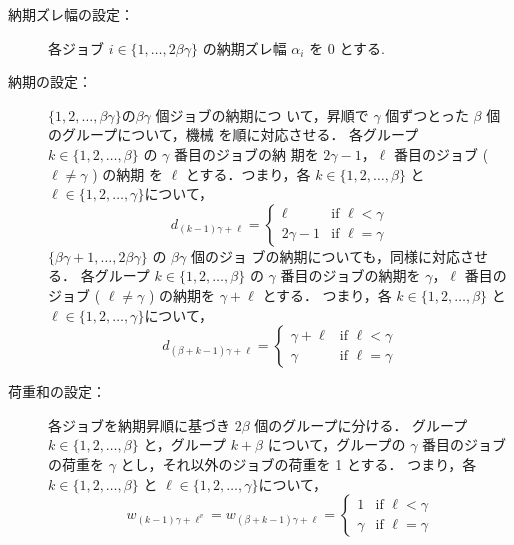 \documentclass[12pt]{optlab-bachelor}
\begin{document}
\begin{description}
  \item[納期ズレ幅の設定：]
  各ジョブ $i \in \{1,\ldots,2\beta \gamma\}$ の納期ズレ幅
  $\alpha_i$ を 0 とする.
  \item[納期の設定：] $\{1,2,\ldots, \beta \gamma\}$$ の $$\beta \gamma$ 個ジョブの納期につ
  いて，昇順で $\gamma$ 個ずつとった $\beta$ 個のグループについて，機械
  を順に対応させる．
  各グループ $k \in \{1,2,\ldots, \beta\}$ の $\gamma$ 番目のジョブの納
  期を $2\gamma - 1$，$\ell$ 番目のジョブ ( $\ell \neq \gamma$ ) の納期
  を $\ell$ とする．つまり，各 $k \in \{1,2,\ldots, \beta\}$ と $\ell \in \{1,2,\ldots,
  \gamma\}$について，
  \begin{displaymath}
    d_{(k - 1)\gamma + \ell} = \left\{ \begin{array}{ll} \ell & \text{if } \ell < \gamma \\ 2\gamma - 1 & \text{if } \ell = \gamma \end{array} \right.
  \end{displaymath}
  $\{\beta \gamma + 1,\ldots, 2\beta \gamma\}$ の $\beta \gamma$ 個のジョ
  ブの納期についても，同様に対応させる．
  各グループ $k \in \{1,2,\ldots, \beta\}$ の $\gamma$ 番目のジョブの納期を $\gamma$，$\ell$ 番目のジョブ ( $\ell \neq \gamma$ ) の納期を $\gamma + \ell$ とする．
  つまり，各 $k \in \{1,2,\ldots, \beta\}$ と $\ell \in \{1,2,\ldots,
  \gamma\}$について，
  \begin{displaymath}
    d_{(\beta + k - 1)\gamma + \ell} = \left\{ \begin{array}{ll}\gamma +  \ell & \text{if } \ell < \gamma \\ \gamma & \text{if } \ell = \gamma \end{array} \right.
  \end{displaymath}
  \item[荷重和の設定：] 各ジョブを納期昇順に基づき $2\beta$ 個のグループに分ける．
  グループ $k \in \{1,2,\ldots,\beta\}$ と，グループ $k + \beta$ について，グループの $\gamma$ 番目のジョブの荷重を $\gamma$ とし，それ以外のジョブの荷重を 1 とする．
  つまり，各 $k \in \{1,2,\ldots, \beta\}$ と $\ell \in \{1,2,\ldots,
  \gamma\}$について，
  \begin{displaymath}
    w_{(k - 1)\gamma + \ell^v} = w_{(\beta + k - 1)\gamma + \ell} = \left\{ \begin{array}{ll} 1 & \text{if } \ell < \gamma \\ \gamma & \text{if } \ell = \gamma \end{array} \right.

\end{displaymath}
\end{description}
\end{document}
